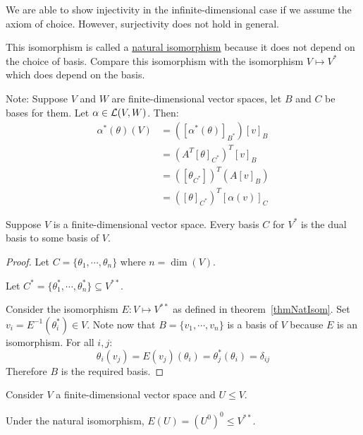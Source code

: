 \documentclass[../Main.tex]{subfiles}
\begin{document}
\begin{remarks}
    \item We are able to show injectivity in the infinite-dimensional case if we assume the axiom of choice. However, surjectivity does not hold in general.
    \item This isomorphism is called a \underline{natural isomorphism} because it does not depend on the choice of basis. Compare this isomorphism with the isomorphism $V \mapsto V^*$ which does depend on the basis.
\end{remarks}
Note: Suppose $V$ and $W$ are finite-dimensional vector spaces, let $B$ and $C$ be bases for them. Let $\alpha \in \mathcal{L}(V, W)$. Then:
\begin{align*}
    \alpha^*(\theta)(V) &= \left([\alpha^*(\theta)]_{B^*}\right) [v]_B \\
    &= \left(A^T [\theta]_{C^*}\right)^T [v]_B \\
    &= \left([\theta_{C^*}]\right)^T (A[v]_B) \\
    &=\left([\theta]_{C^*}\right)^T [\alpha(v)]_C
\end{align*}
\begin{proposition}
    Suppose $V$ is a finite-dimensional vector space. Every basis $C$ for $V^*$ is the dual basis to some basis of $V$.
    \label{propDualBasisBackwards}
\end{proposition}
\begin{proof}
    Let $C = \{\theta_1, \cdots, \theta_n\}$ where $n = \dim(V)$.

    Let $C^* = \{\theta_1^*, \cdots, \theta_n^*\} \subseteq V^{**}$.

    Consider the isomorphism $E : V \mapsto V^{**}$ as defined in theorem~\ref{thmNatIsom}. Set $v_i = E^{-1}(\theta_i^*) \in V$. Note now that $B = \{v_1, \cdots, v_n\}$ is a basis of $V$ because $E$ is an isomorphism. For all $i, j$:
    \begin{equation*}
        \theta_i(v_j) = E(v_j)(\theta_i) = \theta_j^*(\theta_i) = \delta_{ij}
    \end{equation*}
    Therefore $B$ is the required basis.
\end{proof}
\begin{proposition}
    Consider $V$ a finite-dimensional vector space and $U \leq V$.

    Under the natural isomorphism, $E(U) = (U^0)^0 \leq V^{**}$.
    \label{thmNatIsomSubset}
\end{proposition}
\end{document}
